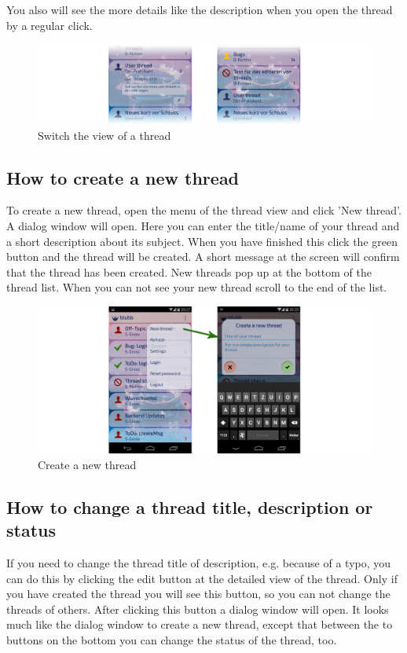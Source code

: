 \documentclass[12pt,a4paper,oneside]{report}
\begin{document}
You also will see the more details like the description when you open the thread by a regular click.

\begin{figure}[!ht]
    \includegraphics[width=\linewidth]{Threads.png}
    \caption{Switch the view of a thread}
\end{figure}


\subsection{How to create a new thread}
To create a new thread, open the menu of the thread view and click 'New thread'. A dialog window will open. Here you can enter the title/name of your thread and a short description about its subject. When you have finished this click the green button and the thread will be created. A short message at the screen will confirm that the thread has been created. New threads pop up at the bottom of the thread list. When you can not see your new thread scroll to the end of the list.

\begin{figure}[!ht]
    \includegraphics[width=\linewidth]{CreateThread.png}
    \caption{Create a new thread}
\end{figure}


\subsection{How to change a thread title, description or status}
If you need to change the thread title of description, e.g. because of a typo, you can do this by clicking the edit button at the detailed view of the thread. Only if you have created the thread you will see this button, so you can not change the threads of others. After clicking this button a dialog window will open. It looks much like the dialog window to create a new thread, except that between the to buttons on the bottom you can change the status of the thread, too. 
\end{document}
